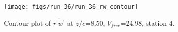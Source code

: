 \begin{figure}[H]
\centering
\texttt{[image: figs/run\_36/run\_36\_rw\_contour]}
\caption{Contour plot of $\overline{r^\prime w^\prime}$ at $z/c$=8.50, $V_{free}$=24.98, station 4.}
\label{fig:run_36_rw_contour}
\end{figure}


